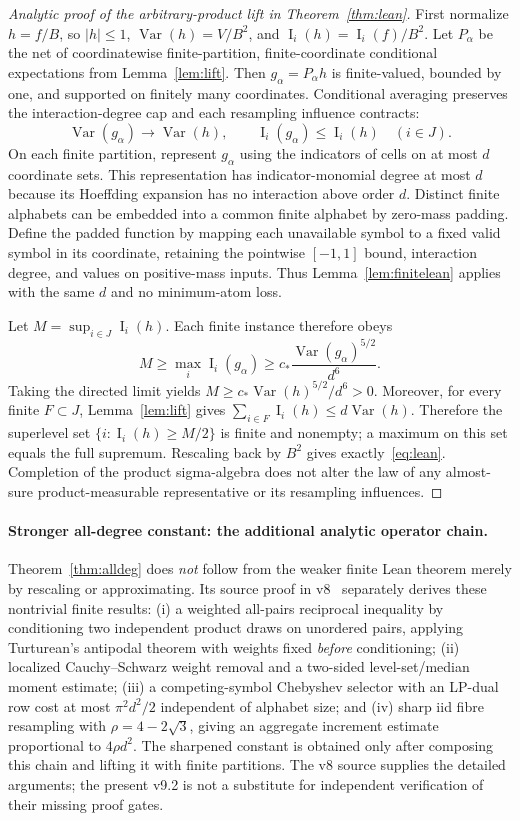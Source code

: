 \documentclass[11pt,letterpaper]{article}
\theoremstyle{definition}\newtheorem{definition}[theorem]{Definition}
\newcommand{\Var}{\operatorname{Var}}
\newcommand{\Inf}{\operatorname{I}}
\begin{document}
\begin{proof}[Analytic proof of the arbitrary-product lift in Theorem~\ref{thm:lean}]
First normalize $h=f/B$, so $|h|\le1$, $\Var(h)=V/B^2$, and $\Inf_i(h)=\Inf_i(f)/B^2$. Let $P_\alpha$ be the net of coordinatewise finite-partition, finite-coordinate conditional expectations from Lemma~\ref{lem:lift}. Then $g_\alpha=P_\alpha h$ is finite-valued, bounded by one, and supported on finitely many coordinates. Conditional averaging preserves the interaction-degree cap and each resampling influence contracts:
\[
 \Var(g_\alpha)\longrightarrow\Var(h),\qquad
 \Inf_i(g_\alpha)\le\Inf_i(h)\quad(i\in J).
\]
On each finite partition, represent $g_\alpha$ using the indicators of cells on at most $d$ coordinate sets. This representation has indicator-monomial degree at most $d$ because its Hoeffding expansion has no interaction above order $d$. Distinct finite alphabets can be embedded into a common finite alphabet by zero-mass padding. Define the padded function by mapping each unavailable symbol to a fixed valid symbol in its coordinate, retaining the pointwise $[-1,1]$ bound, interaction degree, and values on positive-mass inputs. Thus Lemma~\ref{lem:finitelean} applies with the same $d$ and no minimum-atom loss.

Let $M=\sup_{i\in J}\Inf_i(h)$. Each finite instance therefore obeys
\[
 M\ge\max_i\Inf_i(g_\alpha)
 \ge c_*\frac{\Var(g_\alpha)^{5/2}}{d^6}.
\]
Taking the directed limit yields $M\ge c_*\Var(h)^{5/2}/d^6>0$. Moreover, for every finite $F\subset J$, Lemma~\ref{lem:lift} gives $\sum_{i\in F}\Inf_i(h)\le d\Var(h)$. Therefore the superlevel set $\{i:\Inf_i(h)\ge M/2\}$ is finite and nonempty; a maximum on this set equals the full supremum. Rescaling back by $B^2$ gives exactly~\eqref{eq:lean}. Completion of the product sigma-algebra does not alter the law of any almost-sure product-measurable representative or its resampling influences.
\end{proof}

\paragraph{Stronger all-degree constant: the additional analytic operator chain.}
Theorem~\ref{thm:alldeg} does \emph{not} follow from the weaker finite Lean theorem merely by rescaling or approximating. Its source proof in v8~\cite{WrightV8} separately derives these nontrivial finite results: (i) a weighted all-pairs reciprocal inequality by conditioning two independent product draws on unordered pairs, applying Turturean's antipodal theorem with weights fixed \emph{before} conditioning; (ii) localized Cauchy--Schwarz weight removal and a two-sided level-set/median moment estimate; (iii) a competing-symbol Chebyshev selector with an LP-dual row cost at most $\pi^2d^2/2$ independent of alphabet size; and (iv) sharp iid fibre resampling with $\rho=4-2\sqrt3$, giving an aggregate increment estimate proportional to $4\rho d^2$. The sharpened constant is obtained only after composing this chain and lifting it with finite partitions. The v8 source supplies the detailed arguments; the present v9.2 is not a substitute for independent verification of their missing proof gates.
\end{document}
